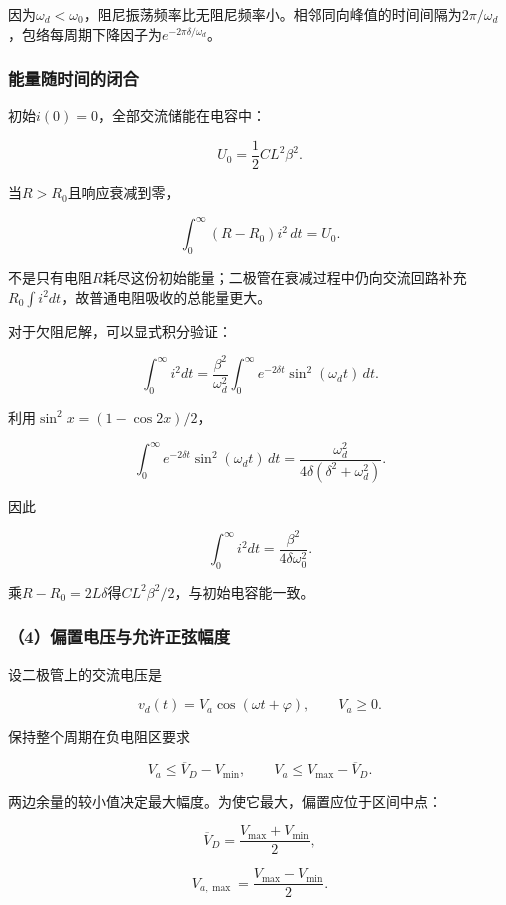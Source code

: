 \documentclass[12pt,a4paper,fontset=fandol]{ctexart}
\begin{document}
因为\(\omega_d<\omega_0\)，阻尼振荡频率比无阻尼频率小。相邻同向峰值的时间间隔为\(2\pi/\omega_d\)，包络每周期下降因子为\(e^{-2\pi\delta/\omega_d}\)。

\subsubsection{能量随时间的闭合}\label{ux80fdux91cfux968fux65f6ux95f4ux7684ux95edux5408}

初始\(i(0)=0\)，全部交流储能在电容中：

\[
U_0=\frac12CL^2\beta^2.
\]

当\(R>R_0\)且响应衰减到零，

\[
\int_0^\infty(R-R_0)i^2\,dt=U_0.
\]

不是只有电阻\(R\)耗尽这份初始能量；二极管在衰减过程中仍向交流回路补充\(R_0\int i^2dt\)，故普通电阻吸收的总能量更大。

对于欠阻尼解，可以显式积分验证：

\[
\int_0^\infty i^2dt
=\frac{\beta^2}{\omega_d^2}
\int_0^\infty e^{-2\delta t}\sin^2(\omega_dt)\,dt.
\]

利用\(\sin^2x=(1-\cos2x)/2\)，

\[
\int_0^\infty e^{-2\delta t}\sin^2(\omega_dt)\,dt
=\frac{\omega_d^2}{4\delta(\delta^2+\omega_d^2)}.
\]

因此

\[
\int_0^\infty i^2dt=\frac{\beta^2}{4\delta\omega_0^2}.
\]

乘\(R-R_0=2L\delta\)得\(CL^2\beta^2/2\)，与初始电容能一致。

\subsubsection{（4）偏置电压与允许正弦幅度}\label{ux504fux7f6eux7535ux538bux4e0eux5141ux8bb8ux6b63ux5f26ux5e45ux5ea6}

设二极管上的交流电压是

\[
v_d(t)=V_a\cos(\omega t+\varphi),
\qquad V_a\geq0.
\]

保持整个周期在负电阻区要求

\[
V_a\leq\overline V_D-V_{\min},
\qquad
V_a\leq V_{\max}-\overline V_D.
\]

两边余量的较小值决定最大幅度。为使它最大，偏置应位于区间中点：

\[
\boxed{
\overline V_D=\frac{V_{\max}+V_{\min}}2},
\]

\[
\boxed{V_{a,\max}=\frac{V_{\max}-V_{\min}}2}.
\]
\end{document}
